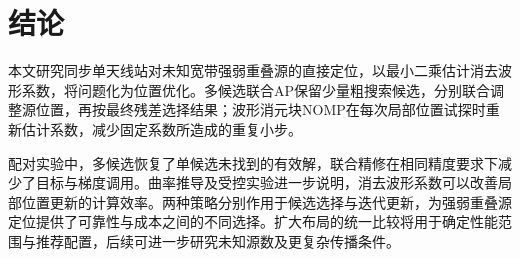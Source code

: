\section{结论}\label{sec:conclusion}
本文研究同步单天线站对未知宽带强弱重叠源的直接定位，以最小二乘估计消去波形系数，将问题化为位置优化。多候选联合AP保留少量粗搜索候选，分别联合调整源位置，再按最终残差选择结果；波形消元块NOMP在每次局部位置试探时重新估计系数，减少固定系数所造成的重复小步。

配对实验中，多候选恢复了单候选未找到的有效解，联合精修在相同精度要求下减少了目标与梯度调用。曲率推导及受控实验进一步说明，消去波形系数可以改善局部位置更新的计算效率。两种策略分别作用于候选选择与迭代更新，为强弱重叠源定位提供了可靠性与成本之间的不同选择。扩大布局的统一比较将用于确定性能范围与推荐配置，后续可进一步研究未知源数及更复杂传播条件。
